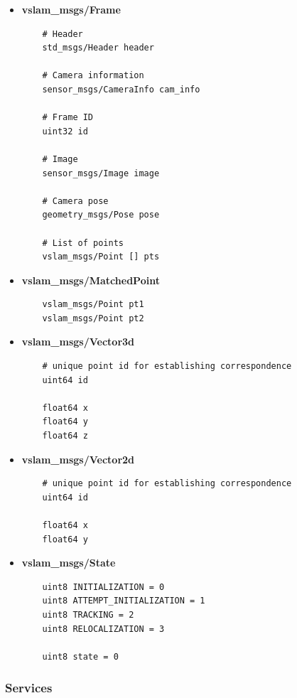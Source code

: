 \begin{itemize}
  \item \textbf{vslam\_msgs/Frame}
  \begin{verbatim}
    # Header
    std_msgs/Header header

    # Camera information
    sensor_msgs/CameraInfo cam_info

    # Frame ID
    uint32 id 

    # Image
    sensor_msgs/Image image
    
    # Camera pose
    geometry_msgs/Pose pose
    
    # List of points
    vslam_msgs/Point [] pts
  \end{verbatim}


  \item \textbf{vslam\_msgs/MatchedPoint}
  \begin{verbatim}
    vslam_msgs/Point pt1    
    vslam_msgs/Point pt2
  \end{verbatim}

  \item \textbf{vslam\_msgs/Vector3d}
  \begin{verbatim}
    # unique point id for establishing correspondence
    uint64 id

    float64 x
    float64 y  
    float64 z 
  \end{verbatim}

  \item \textbf{vslam\_msgs/Vector2d}
  \begin{verbatim}
    # unique point id for establishing correspondence
    uint64 id

    float64 x 
    float64 y 
  \end{verbatim}

  

  \item \textbf{vslam\_msgs/State}
  \begin{verbatim}
    uint8 INITIALIZATION = 0
    uint8 ATTEMPT_INITIALIZATION = 1
    uint8 TRACKING = 2
    uint8 RELOCALIZATION = 3
    
    uint8 state = 0
  \end{verbatim}
\end{itemize}

\subsubsection{Services}


